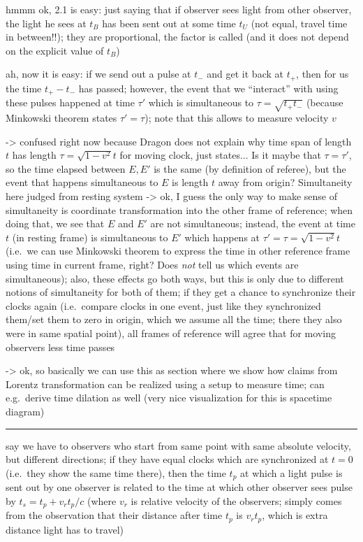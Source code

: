 hmmm ok, 2.1 is easy: just saying that if observer sees light from other observer, the light he sees at $t_B$ has been sent out at some time $t_U$ (not equal, travel time in between!!); they are proportional, the factor is called  (and it does not depend on the explicit value of $t_B$)


ah, now it is easy: if we send out a pulse at $t_-$ and get it back at $t_+$, then for us the time $t_+ - t_-$ has passed; however, the event that we \enquote{interact} with using these pulses happened at time $\tau'$ which is simultaneous to $\tau = \sqrt{t_+ t_-}$ (because Minkowski theorem states $\tau' = \tau$); note that this allows to measure velocity $v$


-> confused right now because Dragon does not explain why time span of length $t$ has length $\tau = \sqrt{1 - v^2} t$ for moving clock, just states... Is it maybe that $\tau = \tau'$, so the time elapsed between $E, E'$ is the same (by definition of referee), but the event that happens simultaneous to $E$ is length $t$ away from origin? Simultaneity here judged from resting system -> ok, I guess the only way to make sense of simultaneity is coordinate transformation into the other frame of reference; when doing that, we see that $E$ and $E'$ are not simultaneous; instead, the event at time $t$ (in resting frame) is simultaneous to $E'$ which happens at $\tau' = \tau = \sqrt{1 - v^2} t$ (i.e.~we can use Minkowski theorem to express the time in other reference frame using time in current frame, right? Does \emph{not} tell us which events are simultaneous); also, these effects go both ways, but this is only due to different notions of simultaneity for both of them; if they get a chance to synchronize their clocks again (i.e.~compare clocks in one event, just like they synchronized them/set them to zero in origin, which we assume all the time; there they also were in same spatial point), all frames of reference will agree that for moving observers less time passes


-> ok, so basically we can use this as section where we show how claims from Lorentz transformation can be realized using a setup to measure time; can e.g.~derive time dilation as well (very nice visualization for this is spacetime diagram)


\hrule



say we have to observers who start from same point with same absolute velocity, but different directions; if they have equal clocks which are synchronized at $t = 0$ (i.e.~they show the same time there), then the time $t_p$ at which a light pulse is sent out by one observer is related to the time at which other observer sees pulse by $t_s = t_p + v_r t_p / c$ (where $v_r$ is relative velocity of the observers; simply comes from the observation that their distance after time $t_p$ is $v_r t_p$, which is extra distance light has to travel)

